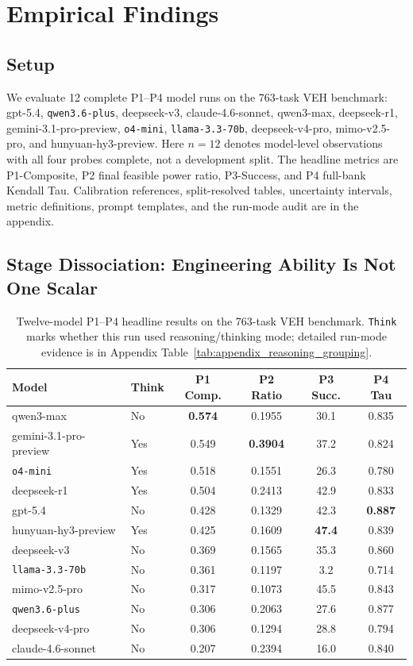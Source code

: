\section{Empirical Findings}
\label{sec:experiments}

\subsection{Setup}

We evaluate 12 complete P1--P4 model runs on the 763-task VEH benchmark: gpt-5.4, \texttt{qwen3.6-plus}, deepseek-v3, claude-4.6-sonnet, qwen3-max, deepseek-r1, gemini-3.1-pro-preview, \texttt{o4-mini}, \texttt{llama-3.3-70b}, deepseek-v4-pro, mimo-v2.5-pro, and hunyuan-hy3-preview. Here \(n=12\) denotes model-level observations with all four probes complete, not a development split. The headline metrics are P1-Composite, P2 final feasible power ratio, P3-Success, and P4 full-bank Kendall Tau. Calibration references, split-resolved tables, uncertainty intervals, metric definitions, prompt templates, and the run-mode audit are in the appendix.

\subsection{Stage Dissociation: Engineering Ability Is Not One Scalar}

\begin{table}[t]
\caption{Twelve-model P1--P4 headline results on the 763-task VEH benchmark. \texttt{Think} marks whether this run used reasoning/thinking mode; detailed run-mode evidence is in Appendix Table~\ref{tab:appendix_reasoning_grouping}.}
\label{tab:main_results}
\centering
\scriptsize
\setlength{\tabcolsep}{4pt}
\renewcommand{\arraystretch}{1.08}
\begin{tabular}{llcccc}
\toprule
Model & Think & P1 Comp. & P2 Ratio & P3 Succ. & P4 Tau \\
\midrule
qwen3-max & No & \textbf{0.574} & 0.1955 & 30.1 & 0.835 \\
gemini-3.1-pro-preview & Yes & 0.549 & \textbf{0.3904} & 37.2 & 0.824 \\
\texttt{o4-mini} & Yes & 0.518 & 0.1551 & 26.3 & 0.780 \\
deepseek-r1 & Yes & 0.504 & 0.2413 & 42.9 & 0.833 \\
gpt-5.4 & No & 0.428 & 0.1329 & 42.3 & \textbf{0.887} \\
hunyuan-hy3-preview & Yes & 0.425 & 0.1609 & \textbf{47.4} & 0.839 \\
deepseek-v3 & No & 0.369 & 0.1565 & 35.3 & 0.860 \\
\texttt{llama-3.3-70b} & No & 0.361 & 0.1197 & 3.2 & 0.714 \\
mimo-v2.5-pro & No & 0.317 & 0.1073 & 45.5 & 0.843 \\
\texttt{qwen3.6-plus} & No & 0.306 & 0.2063 & 27.6 & 0.877 \\
deepseek-v4-pro & No & 0.306 & 0.1294 & 28.8 & 0.794 \\
claude-4.6-sonnet & No & 0.207 & 0.2394 & 16.0 & 0.840 \\
\bottomrule
\end{tabular}
\end{table}

